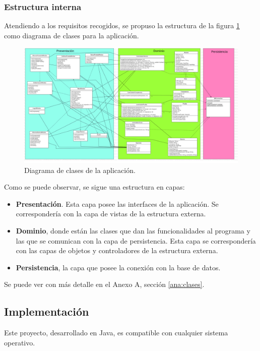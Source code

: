 \subsubsection{Estructura interna}

Atendiendo a los requisitos recogidos, se propuso la estructura de la figura \ref{fig:diagramaclases} como diagrama de clases para la aplicación.

\begin{figure}
  \centering
  \caption{Diagrama de clases de la aplicación.}
  \label{fig:diagramaclases}
  \includegraphics[width=1\linewidth]{figs/ClassDiagram.png}
\end{figure}

Como se puede observar, se sigue una estructura en capas:
\begin{itemize}
\item\textbf{Presentación}. Esta capa posee las interfaces de la aplicación. Se correspondería con la capa de vistas de la estructura externa.
\item\textbf{Dominio}, donde están las clases que dan las funcionalidades al programa y las que se comunican con la capa de persistencia. Esta capa se correspondería con las capas de objetos y controladores de la estructura externa.
\item\textbf{Persistencia}, la capa que posee la conexión con la base de datos.
\end{itemize}

Se puede ver con más detalle en el Anexo A, sección \ref{ana:clases}.



\subsection{Implementación}
\label{sub:implementacion}
Este proyecto, desarrollado en Java, es compatible con cualquier sistema operativo.

